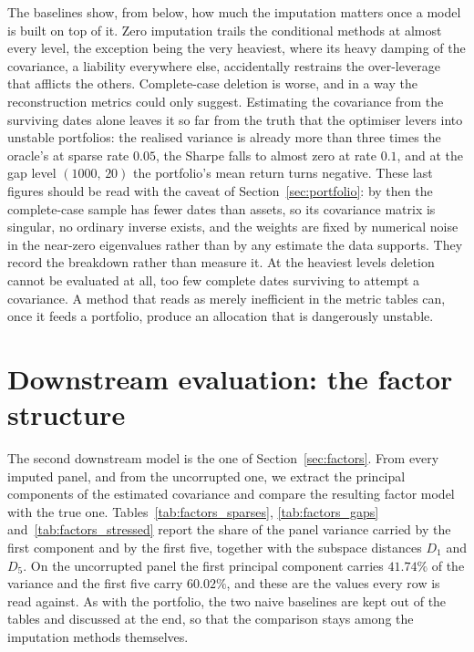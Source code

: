 The baselines show, from below, how much the imputation matters once a model is
built on top of it. Zero imputation trails the conditional methods at almost
every level, the exception being the very heaviest, where its heavy damping of
the covariance, a liability everywhere else, accidentally restrains the
over-leverage that afflicts the others. Complete-case deletion is worse, and in a
way the reconstruction metrics could only suggest. Estimating the covariance from
the surviving dates alone leaves it so far from the truth that the optimiser
levers into unstable portfolios: the realised variance is already more than three
times the oracle's at sparse rate $0.05$, the Sharpe falls to almost zero at rate
$0.1$, and at the gap level $(1000,\,20)$ the portfolio's mean return turns
negative. These last figures should be read with the caveat of
Section~\ref{sec:portfolio}: by then the complete-case sample has fewer dates
than assets, so its covariance matrix is singular, no ordinary inverse exists,
and the weights are fixed by numerical noise in the near-zero eigenvalues rather
than by any estimate the data supports. They record the breakdown rather than
measure it. At the heaviest levels deletion cannot be evaluated at all, too few
complete dates surviving to attempt a covariance. A method that reads as merely
inefficient in the metric tables can, once it feeds a portfolio, produce an
allocation that is dangerously unstable.

\section{Downstream evaluation: the factor structure}
\label{sec:results_factors}

The second downstream model is the one of Section~\ref{sec:factors}. From every
imputed panel, and from the uncorrupted one, we extract the principal components
of the estimated covariance and compare the resulting factor model with the true
one. Tables~\ref{tab:factors_sparses}, \ref{tab:factors_gaps}
and~\ref{tab:factors_stressed} report the share of the panel variance carried by
the first component and by the first five, together with the subspace distances
$D_1$ and $D_5$. On the uncorrupted panel the first principal component carries
$41.74\%$ of the variance and the first five carry $60.02\%$, and these are the
values every row is read against. As with the portfolio, the two naive baselines
are kept out of the tables and discussed at the end, so that the comparison stays
among the imputation methods themselves.

